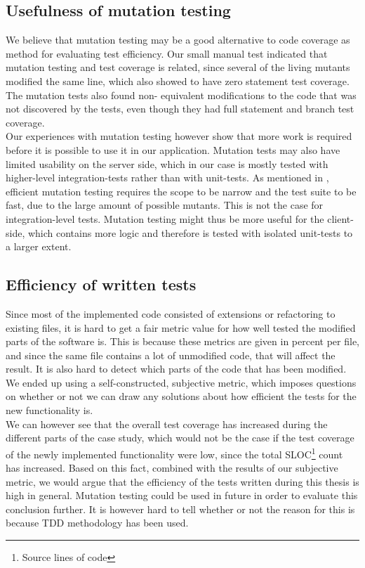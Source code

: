 \subsection{Usefulness of mutation testing}

We believe that mutation testing may be a good alternative to code
coverage as method for evaluating test efficiency. Our small manual test
indicated that mutation testing and test coverage is related, since
several of the living mutants modified the same line, which also showed
to have zero statement test coverage. The mutation tests also found non-
equivalent modifications to the code that was not discovered by the
tests, even though they had full statement and branch test coverage.\\

Our experiences with mutation testing however show that more work is
required before it is possible to use it in our application. Mutation
tests may also have limited usability on the server side, which in our
case is mostly tested with higher-level integration-tests rather than
with unit-tests. As mentioned in , efficient
mutation testing requires the scope to be narrow and the test suite to
be fast, due to the large amount of possible mutants. This is not the
case for integration-level tests. Mutation testing might thus be more
useful for the client-side, which contains more logic and therefore is
tested with isolated unit-tests to a larger extent.\\


\subsection{Efficiency of written tests}

Since most of the implemented code consisted of extensions or
refactoring to existing files, it is hard to get a fair metric value for
how well tested the modified parts of the software is. This is because
these metrics are given in percent per file, and since the same file
contains a lot of unmodified code, that will affect the result. It is
also hard to detect which parts of the code that has been modified. We
ended up using a self-constructed, subjective metric, which imposes
questions on whether or not we can draw any solutions about how
efficient the tests for the new functionality is.\\

We can however see that the overall test coverage has increased during
the different parts of the case study, which would not be the case if
the test coverage of the newly implemented functionality were low, since
the total SLOC\footnote{Source lines of code} count has increased. Based
on this fact, combined with the results of our subjective metric, we
would argue that the efficiency of the tests written during this thesis
is high in general. Mutation testing could be used in future in order to
evaluate this conclusion further. It is however hard to tell whether or
not the reason for this is because TDD methodology has been used.\\

